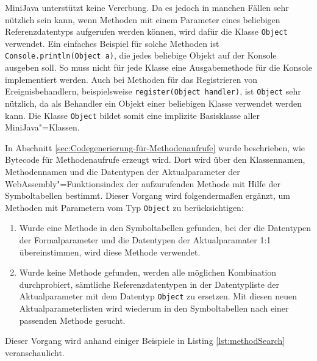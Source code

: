MiniJava unterstützt keine Vererbung. Da es jedoch in manchen Fällen sehr nützlich sein kann, wenn Methoden mit einem Parameter eines beliebigen Referenzdatentyps aufgerufen werden können, wird dafür die Klasse \lstinline{Object} verwendet. Ein einfaches Beispiel für solche Methoden ist \lstinline{Console.println(Object a)}, die jedes beliebige Objekt auf der Konsole ausgeben soll. So muss nicht für jede Klasse eine Ausgabemethode für die Konsole implementiert werden. Auch bei Methoden für das Registrieren von Ereignisbehandlern, beispielsweise \lstinline{register(Object handler)}, ist \lstinline{Object} sehr nützlich, da als Behandler ein Objekt einer beliebigen Klasse verwendet werden kann. Die Klasse \lstinline{Object} bildet somit eine implizite Basisklasse aller MiniJava"=Klassen.

In Abschnitt \ref{sec:Codegenerierung-für-Methodenaufrufe} wurde beschrieben, wie Bytecode für Methodenaufrufe erzeugt wird. Dort wird über den Klassennamen, Methodennamen und die Datentypen der Aktualparameter der WebAssembly"=Funktionsindex der aufzurufenden Methode mit Hilfe der Symboltabellen bestimmt. Dieser Vorgang wird folgendermaßen ergänzt, um Methoden mit Parametern vom Typ \lstinline{Object} zu berücksichtigen:

\begin{enumerate}
    \item Wurde eine Methode in den Symboltabellen gefunden, bei der die Datentypen der Formalparameter und die Datentypen der Aktualparamater 1:1 übereinstimmen, wird diese Methode verwendet.
    \item Wurde keine Methode gefunden, werden alle möglichen Kombination durchprobiert, sämtliche Referenzdatentypen in der Datentypliste der Aktualparameter mit dem Datentyp \lstinline{Object} zu ersetzen. Mit diesen neuen Aktualparameterlisten wird wiederum in den Symboltabellen nach einer passenden Methode gesucht.
\end{enumerate}

Dieser Vorgang wird anhand einiger Beispiele in Listing \ref{lst:methodSearch} veranschaulicht.

\pagebreak


